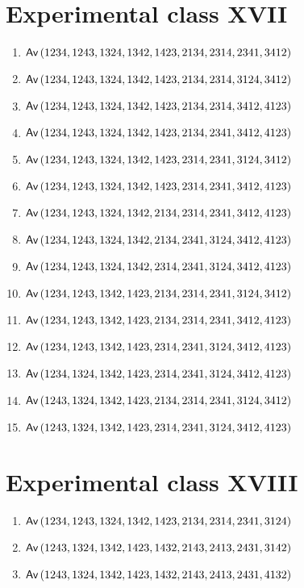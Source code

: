 \section{Experimental class XVII}
\begin{enumerate}
\item $\textsf{Av}\left(1234,1243,1324,1342,1423,2134,2314,2341,3412\right)$
\item $\textsf{Av}\left(1234,1243,1324,1342,1423,2134,2314,3124,3412\right)$
\item $\textsf{Av}\left(1234,1243,1324,1342,1423,2134,2314,3412,4123\right)$
\item $\textsf{Av}\left(1234,1243,1324,1342,1423,2134,2341,3412,4123\right)$
\item $\textsf{Av}\left(1234,1243,1324,1342,1423,2314,2341,3124,3412\right)$
\item $\textsf{Av}\left(1234,1243,1324,1342,1423,2314,2341,3412,4123\right)$
\item $\textsf{Av}\left(1234,1243,1324,1342,2134,2314,2341,3412,4123\right)$
\item $\textsf{Av}\left(1234,1243,1324,1342,2134,2341,3124,3412,4123\right)$
\item $\textsf{Av}\left(1234,1243,1324,1342,2314,2341,3124,3412,4123\right)$
\item $\textsf{Av}\left(1234,1243,1342,1423,2134,2314,2341,3124,3412\right)$
\item $\textsf{Av}\left(1234,1243,1342,1423,2134,2314,2341,3412,4123\right)$
\item $\textsf{Av}\left(1234,1243,1342,1423,2314,2341,3124,3412,4123\right)$
\item $\textsf{Av}\left(1234,1324,1342,1423,2314,2341,3124,3412,4123\right)$
\item $\textsf{Av}\left(1243,1324,1342,1423,2134,2314,2341,3124,3412\right)$
\item $\textsf{Av}\left(1243,1324,1342,1423,2314,2341,3124,3412,4123\right)$
\end{enumerate}

\section{Experimental class XVIII}
\begin{enumerate}
\item $\textsf{Av}\left(1234,1243,1324,1342,1423,2134,2314,2341,3124\right)$
\item $\textsf{Av}\left(1243,1324,1342,1423,1432,2143,2413,2431,3142\right)$
\item $\textsf{Av}\left(1243,1324,1342,1423,1432,2143,2413,2431,4132\right)$
\end{enumerate}

